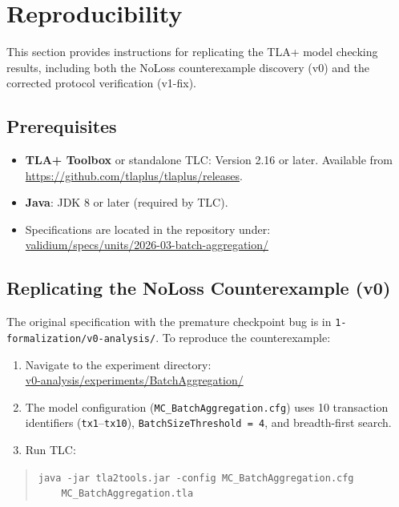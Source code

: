 
\section{Reproducibility}
\label{sec:reproducibility}

This section provides instructions for replicating the TLA+ model checking
results, including both the NoLoss counterexample discovery (v0) and the
corrected protocol verification (v1-fix).

\subsection{Prerequisites}

\begin{itemize}
\item \textbf{TLA+ Toolbox} or standalone TLC: Version 2.16 or later.
  Available from \url{https://github.com/tlaplus/tlaplus/releases}.
\item \textbf{Java}: JDK 8 or later (required by TLC).
\item Specifications are located in the repository under:\\
  \url{validium/specs/units/2026-03-batch-aggregation/}
\end{itemize}

\subsection{Replicating the NoLoss Counterexample (v0)}

The original specification with the premature checkpoint bug is in
\texttt{1-formalization/v0-analysis/}. To reproduce the counterexample:

\begin{enumerate}
\item Navigate to the experiment directory:\\
  \url{v0-analysis/experiments/BatchAggregation/}
\item The model configuration (\texttt{MC\_BatchAggregation.cfg}) uses
  10 transaction identifiers (\texttt{tx1}--\texttt{tx10}),
  \texttt{BatchSizeThreshold~=~4}, and breadth-first search.
\item Run TLC:
\end{enumerate}

\begin{quote}
\small
\texttt{java -jar tla2tools.jar -config MC\_BatchAggregation.cfg}\\
\texttt{~~~~MC\_BatchAggregation.tla}
\end{quote}

